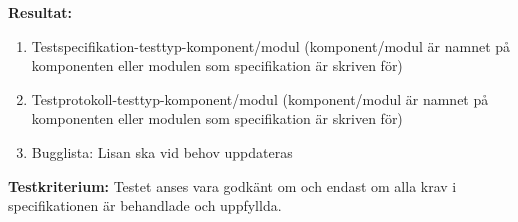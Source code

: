 \documentclass[a4paper,10pt, twoside]{article}
\begin{document}
\textbf{Resultat:}
    \begin{enumerate}
        \item \label{itm:Testspecifikation-a}
        Testspecifikation-testtyp-komponent/modul (komponent/modul är namnet på
        komponenten eller modulen som specifikation är skriven för)
        \item \label{itm:Testprotokoll-a} Testprotokoll-testtyp-komponent/modul
        (komponent/modul är namnet på komponenten eller modulen som
        specifikation är skriven för)
        \item Bugglista: Lisan ska vid behov uppdateras
    \end{enumerate}

\textbf{Testkriterium:} Testet anses vara godkänt om och endast om alla krav i specifikationen är behandlade och uppfyllda.
\clearpage
\printbibliography
\end{document}
